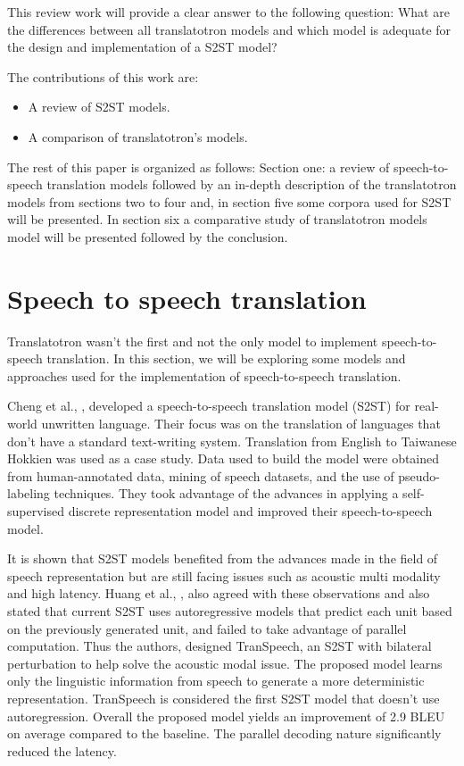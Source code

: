 \documentclass[12pt]{article}
\begin{document}
This review work will provide a clear answer to the following question: 
What are the differences between all translatotron models and which model is adequate for the design and implementation of a S2ST model?

The contributions of this work are:
\begin{itemize}
\item  A review of S2ST models. 
\item A comparison of translatotron's models. 
\end{itemize}

The rest of this paper is organized as follows: Section one: a review of speech-to-speech translation models followed by an in-depth description of the translatotron models from sections two to four and, in section five some corpora used for S2ST will be presented. In section six a comparative study of translatotron models model will be presented followed by the conclusion.


\section{Speech to speech translation}
Translatotron wasn't the first and not the only model to implement speech-to-speech translation. In this section, we will be exploring some models and approaches used for the implementation of speech-to-speech translation.

Cheng et al., \cite{chan}, developed a speech-to-speech translation model (S2ST) for real-world unwritten language. Their focus was on the translation of languages that don't have a standard text-writing system. Translation from English to Taiwanese Hokkien was used as a case study. Data used to build the model were obtained from human-annotated data, mining of speech datasets, and the use of pseudo-labeling techniques. They took advantage of the advances in applying a self-supervised discrete representation model and improved their speech-to-speech model.

It is shown that S2ST models benefited from the advances made in the field of speech representation but are still facing issues such as acoustic multi modality and high latency. Huang et al., \cite{huang}, also agreed with these observations and also stated that current S2ST uses autoregressive models that predict each unit based on the previously generated unit, and failed to take advantage of parallel computation. Thus the authors, designed TranSpeech, an S2ST with bilateral perturbation to help solve the acoustic modal issue. The proposed model learns only the linguistic information from speech to generate a more deterministic representation. TranSpeech is considered the first S2ST model that doesn't use autoregression. Overall the proposed model yields an improvement of 2.9 BLEU on average compared to the baseline. The parallel decoding nature significantly reduced the latency.
\end{document}

